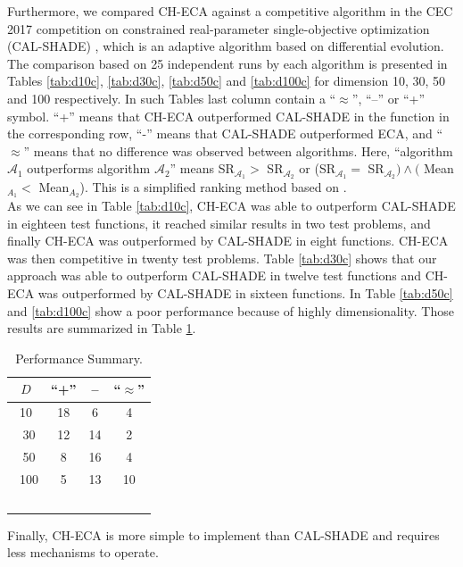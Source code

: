 \documentclass[conference]{IEEEtran}
\begin{document}
Furthermore, we compared CH-ECA against a  competitive algorithm in 
the CEC 2017 competition on constrained real-parameter single-objective optimization (CAL-SHADE) \cite{zamuda2017adaptive}, which is an adaptive algorithm based on differential evolution. The comparison based on 25 independent runs by each algorithm is presented in Tables \ref{tab:d10c}, \ref{tab:d30c}, \ref{tab:d50c} and \ref{tab:d100c} for dimension 10, 30, 50 and 100 respectively. In such Tables last column contain a ``$\approx$'', ``--'' or ``+'' symbol. ``+'' means that CH-ECA outperformed CAL-SHADE in the function  %
	in the corresponding row, ``-'' means that CAL-SHADE outperformed ECA, and  %
	``$\approx$'' means that no difference was observed between algorithms. Here, ``algorithm $\mathcal{A}_1$ outperforms algorithm $\mathcal{A}_2$'' means SR$_{\mathcal{A}_1} > $ SR$_{\mathcal{A}_2}$ or (SR$_{\mathcal{A}_1} = $ SR$_{\mathcal{A}_2}) \wedge ($ Mean$_{A_1} < $ Mean$_{A_2}$). This is a simplified ranking method based on \cite{cecCop17}. \\

As we can see in Table \ref{tab:d10c}, CH-ECA was able to outperform CAL-SHADE in eighteen test functions, it reached similar results in two test problems, and finally CH-ECA was outperformed by CAL-SHADE in eight functions. CH-ECA was then competitive in twenty test problems. %
%
Table \ref{tab:d30c} shows that our approach was able to outperform CAL-SHADE in twelve test functions and CH-ECA was outperformed by CAL-SHADE in sixteen functions.
%
In Table \ref{tab:d50c} and \ref{tab:d100c} show a poor performance because of highly dimensionality. Those results are summarized in Table \ref{tab:summary}.

\begin{table}[!ht]
	\caption{Performance Summary.}
	\label{tab:summary}
	\centering
	\begin{tabular}{c|ccc}
		$D$ & ``+'' &  -- & ``$\approx$'' \\ \hline
		10  & 18    &  6  & 4  \\ \
		30  & 12    &  14 & 2  \\ \
		50  & 8     &  16 & 4 \\ \
	   100  & 5     &  13 & 10  \\ \
	\end{tabular}
\end{table}


Finally, CH-ECA is more simple to implement than CAL-SHADE and requires less 
mechanisms to operate.
\end{document}
